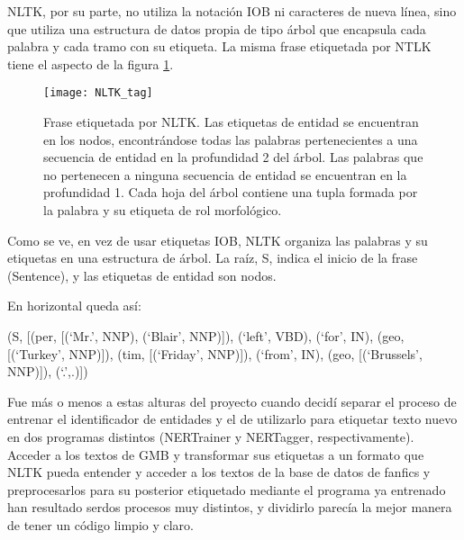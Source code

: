 \documentclass{pre-tfg}
\begin{document}
NLTK, por su parte, no utiliza la notación IOB  ni caracteres de nueva línea, sino que utiliza una estructura de datos propia de tipo árbol que encapsula cada palabra y cada tramo con su etiqueta. La misma frase etiquetada por NTLK tiene el aspecto de la figura \ref{fig:tags2}.

\begin{figure}[h]
	\texttt{[image: NLTK\_tag]}
	\caption{Frase etiquetada por NLTK. Las etiquetas de entidad se encuentran en los nodos, encontrándose todas las palabras pertenecientes a una secuencia de entidad en la profundidad 2 del árbol. Las palabras que no pertenecen a ninguna secuencia de entidad se encuentran en la profundidad 1. Cada hoja del árbol contiene una tupla formada por la palabra y su etiqueta de rol morfológico.}
	\label{fig:tags2}
	\centering
\end{figure}

Como se ve, en vez de usar etiquetas IOB, NLTK organiza las palabras y su etiquetas en una estructura de árbol. La raíz, S, indica el inicio de la frase (Sentence), y las etiquetas de entidad son nodos.

En horizontal queda así:

(S, [(per, [(‘Mr.’, NNP), (‘Blair’, NNP)]), (‘left’, VBD), (‘for’, IN), (geo, [(‘Turkey’, NNP)]), (tim, [(‘Friday’, NNP)]), (‘from’, IN), (geo, [(‘Brussels’, NNP)]), (‘.’,.)])

Fue más o menos a estas alturas del proyecto cuando decidí separar el proceso de entrenar el identificador de entidades y el de utilizarlo para etiquetar texto nuevo en dos programas distintos (NERTrainer y NERTagger, respectivamente). Acceder a los textos de GMB y transformar sus etiquetas a un formato que NLTK pueda entender y acceder a los textos de la base de datos de fanfics y preprocesarlos para su posterior etiquetado mediante el programa ya entrenado han resultado serdos procesos muy distintos, y dividirlo parecía la mejor manera de tener un código limpio y claro.

\end{document}
